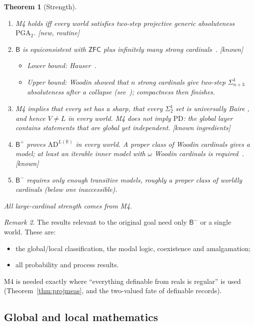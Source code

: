 \documentclass[11pt]{article}
\newtheorem{theorem}{Theorem}[section]
\theoremstyle{definition}
\theoremstyle{remark}
\newtheorem{remark}[theorem]{Remark}
\newcommand{\B}{\mathsf{B}}
\newcommand{\Bm}{\mathsf{B}^{-}}
\newcommand{\Bp}{\mathsf{B}^{+}}
\newcommand{\ZFC}{\mathsf{ZFC}}
\newcommand{\R}{\mathbb{R}}
\newcommand{\status}[1]{\textsf{[#1]}}
\begin{document}
\begin{theorem}[Strength]\label{thm:strength}
\leavevmode
\begin{enumerate}
\item M4 holds iff every world satisfies two-step projective generic absoluteness $\mathrm{PGA}_2$. \status{new, routine}
\item $\B$ is equiconsistent with $\ZFC$ plus infinitely many strong cardinals~\cite{Kanamori03}. \status{known}
  \begin{itemize}
  \item Lower bound: Hauser~\cite{Hauser95}.
  \item Upper bound: Woodin showed that $n$ strong cardinals give two-step $\Sigma^1_{n+3}$ absoluteness after a collapse (see~\cite{Wilson18}); compactness then finishes.
  \end{itemize}
\item M4 implies that every set has a sharp, that every $\Sigma^1_2$ set is universally Baire \cite{FMW92,Wilson17}, and hence $V\ne L$ in every world. M4 does not imply $\mathrm{PD}$: the global layer contains statements that are global yet independent. \status{known ingredients}
\item $\Bp$ proves $\mathrm{AD}^{L(\R)}$ in every world. A proper class of Woodin cardinals gives a model; at least an iterable inner model with $\omega$ Woodin cardinals is required~\cite{Steel04,Larson04}. \status{known}
\item $\Bm$ requires only enough transitive models, roughly a proper class of worldly cardinals (below one inaccessible).
\end{enumerate}
All large-cardinal strength comes from M4.
\end{theorem}

\begin{remark}
The results relevant to the original goal need only $\Bm$ or a single world. These are:
\begin{itemize}
\item the global/local classification, the modal logic, coexistence and amalgamation;
\item all probability and process results.
\end{itemize}
M4 is needed exactly where ``everything definable from reals is regular'' is used (Theorem~\ref{thm:projmeas}, and the two-valued fate of definable records).
\end{remark}

\subsection{Global and local mathematics}
\end{document}
